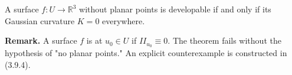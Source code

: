 A surface $f: U \to \mathbb{R}^3$ without planar points is developable if and only if its Gaussian curvature $K = 0$ everywhere.

\textbf{Remark.} A surface $f$ is  at $u_0 \in U$ if $II_{u_0} \equiv 0$. The theorem fails without the hypothesis of "no planar points." An explicit counterexample is constructed in (3.9.4).
